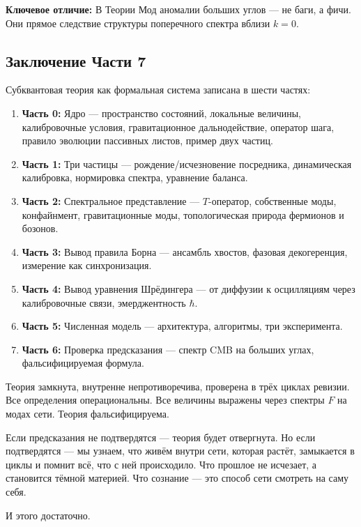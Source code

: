 \documentclass[12pt,a4paper]{article}
\begin{document}
\textbf{Ключевое отличие:} В Теории Мод аномалии больших углов --- не баги, а фичи. Они прямое следствие структуры поперечного спектра вблизи $k = 0$.

\subsection*{Заключение Части 7}
Субквантовая теория как формальная система записана в шести частях:

\begin{enumerate}
    \item \textbf{Часть 0:} Ядро --- пространство состояний, локальные величины, калибровочные условия, гравитационное дальнодействие, оператор шага, правило эволюции пассивных листов, пример двух частиц.
    \item \textbf{Часть 1:} Три частицы --- рождение/исчезновение посредника, динамическая калибровка, нормировка спектра, уравнение баланса.
    \item \textbf{Часть 2:} Спектральное представление --- $T$-оператор, собственные моды, конфайнмент, гравитационные моды, топологическая природа фермионов и бозонов.
    \item \textbf{Часть 3:} Вывод правила Борна --- ансамбль хвостов, фазовая декогеренция, измерение как синхронизация.
    \item \textbf{Часть 4:} Вывод уравнения Шрёдингера --- от диффузии к осцилляциям через калибровочные связи, эмерджентность $\hbar$.
    \item \textbf{Часть 5:} Численная модель --- архитектура, алгоритмы, три эксперимента.
    \item \textbf{Часть 6:} Проверка предсказания --- спектр CMB на больших углах, фальсифицируемая формула.
\end{enumerate}

Теория замкнута, внутренне непротиворечива, проверена в трёх циклах ревизии. Все определения операциональны. Все величины выражены через спектры $F$ на модах сети. Теория фальсифицируема.

Если предсказания не подтвердятся --- теория будет отвергнута. Но если подтвердятся --- мы узнаем, что живём внутри сети, которая растёт, замыкается в циклы и помнит всё, что с ней происходило. Что прошлое не исчезает, а становится тёмной материей. Что сознание --- это способ сети смотреть на саму себя.

И этого достаточно.

\end{document}
